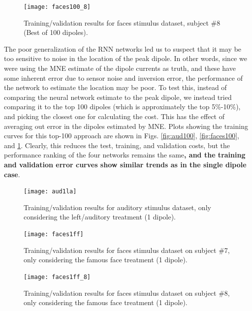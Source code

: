\documentclass[journal,12pt,onecolumn,draftclsnofoot,]{IEEEtran}
\begin{document}
\begin{figure}[h!]
\centering
\texttt{[image: faces100\_8]}
\caption{Training/validation results for faces stimulus dataset, subject \#8 (Best of 100 dipoles).}
\label{fig:faces100_8}
\end{figure}

The poor generalization of the RNN networks led us to suspect that it may be too sensitive to noise in the location of the peak dipole. In other words, since we were using the MNE estimate of the dipole currents as truth, and these have some inherent error due to sensor noise and inversion error, the performance of the network to estimate the location may be poor. To test this, instead of comparing the neural network estimate to the peak dipole, we instead tried comparing it to the top 100 dipoles (which is approximately the top 5\%-10\%), and picking the closest one for calculating the cost. This has the effect of averaging out error in the dipoles estimated by MNE. Plots showing the training curves for this top-100 approach are shown in Figs. \ref{fig:aud100}, \ref{fig:faces100}, and \ref{fig:faces100_8}. Clearly, this reduces the test, training, and validation costs, but the performance ranking of the four networks remains the same\textbf{, and the training and validation error curves show similar trends as in the single dipole case}.

\begin{figure}[h!]
\centering
\texttt{[image: aud1la]}
\caption{Training/validation results for auditory stimulus dataset, only considering the left/auditory treatment (1 dipole).}
\label{fig:aud1la}
\end{figure}


\begin{figure}[h!]
\centering
\texttt{[image: faces1ff]}
\caption{Training/validation results for faces stimulus dataset on subject \#7, only considering the famous face treatment (1 dipole).}
\label{fig:faces1ff}
\end{figure}

\begin{figure}[h!]
\centering
\texttt{[image: faces1ff\_8]}
\caption{Training/validation results for faces stimulus dataset on subject \#8, only considering the famous face treatment (1 dipole).}
\label{fig:faces1ff_8}
\end{figure}
\end{document}
